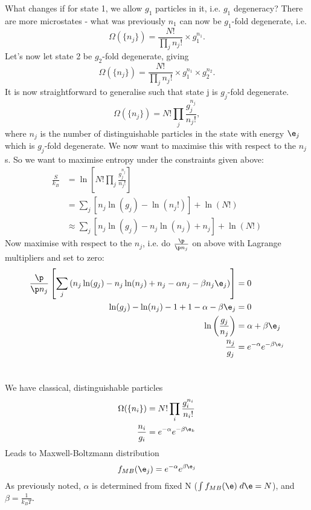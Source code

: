 \documentclass[a4paper, 11pt, normalem]{report}
\begin{document}
What changes if for state 1, we allow $g_1$ particles in it, i.e. $g_1$ degeneracy?
There are more microstates - what was previously $n_1$ can now be $g_1$-fold degenerate, i.e.
\begin{equation}
    \Omega(\{n_j\}) = \frac{N!}{\prod_j n_j!}\times g_1^{n_1}.
\end{equation}
Let's now let state 2 be $g_2$-fold degenerate, giving
\begin{equation}
    \Omega(\{n_j\}) = \frac{N!}{\prod_j n_j!}\times g_1^{n_1} \times g_2^{n_2}.
\end{equation}
It is now straightforward to generalise such that state j is $g_j$-fold degenerate. 
\begin{equation}
    \Omega(\{n_j\}) = N! \prod_j \frac{g_j^{n_j}}{n_j!},
\end{equation}
where $n_j$ is the number of distinguishable particles in the state with energy $\e_j$ which is $g_j$-fold degenerate.
We now want to maximise this with respect to the $n_j$s.
So we want to maximise entropy under the constraints given above: 
\begin{align}
    \frac{S}{k_B} &= \ln\left[N!\prod_j \frac{g_j^{n_j}}{n_j!}\right] \\
                  &= \sum_j \left[n_j\ln(g_j) - \ln(n_j!)\right] + \ln(N!) \\
                  &\approx \sum_j \left[n_j\ln(g_j) - n_j\ln(n_j) + n_j\right] + \ln(N!)
\end{align}
Now maximise with respect to the $n_j$, i.e. do $\frac{\p}{\p n_j}$ on above with Lagrange multipliers and set to zero:
\begin{align}
    \frac{\p}{\p n_j} \left[\sum_j \left(n_j\ln(g_j) - n_j\ln(n_j) + n_j - \alpha n_j - \beta n_j\e_j\right)\right] &= 0 \\
    \ln(g_j) - \ln(n_j) - 1 + 1 - \alpha - \beta\e_j &= 0 \\
    \ln\left(\frac{g_j}{n_j}\right) &= \alpha + \beta\e_j \\
    \frac{n_j}{g_j} &= e^{-\alpha}e^{-\beta\e_j}
\end{align}

\chapter{}
We have classical, distinguishable particles
\begin{align}
    \Omega(\{n_i\}) &= N!\prod_i \frac{g_i^{n_i}}{n_i!} \\
    \frac{n_i}{g_i} &= e^{-\alpha}e^{-\beta \e_k}
\end{align}
Leads to Maxwell-Boltzmann distribution
\begin{equation}
    f_{MB}(\e_j) = e^{-\alpha}e^{\beta \e_j}
\end{equation}
As previously noted, $\alpha$ is determined from fixed N ($\int f_{MB}(\e)\;d\e = N$), and $\beta = \frac{1}{k_BT}$.
\end{document}
